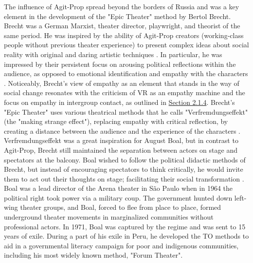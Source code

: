 \documentclass[dissertation,math,vertlayout,pdfa,colorlinks,nologo]{aaltoseries}
\begin{document}
The influence of Agit-Prop spread beyond the borders of Russia and was a key element in the development of the "Epic Theater" method by Bertol Brecht. Brecht was a German Marxist, theater director, playwright, and theorist of the same period. He was inspired by the ability of Agit-Prop creators (working-class people without previous theater experience) to present complex ideas about social reality with original and daring artistic techniques \cite{brechtBrechtTheatreTrans1964}. In particular, he was impressed by their persistent focus on arousing political reflections within the audience, as opposed to emotional identification and empathy with the characters \cite{brechtBrechtTheatreTrans1964,friedmanPerformanceActivismPrecursors2021}. Noticeably, Brecht's view of empathy as an element that stands in the way of social change resonates with the criticism of VR as an empathy machine and the focus on empathy in intergroup contact, as outlined in \hyperref[sec:vr_empathy]{Section 2.1.4}. Brecht's "Epic Theater" uses various theatrical methods that he calls "Verfremdungseffekt" (the "making strange effect"), replacing empathy with critical reflection, by creating a distance between the audience and the experience of the characters \cite{brechtBrechtTheatreTrans1964}. Verfremdungseffekt was a great inspiration for August Boal, but in contrast to Agit-Prop, Brecht still maintained the separation between actors on stage and spectators at the balcony. Boal wished to follow the political didactic methods of Brecht, but instead of encouraging spectators to think critically, he would invite them to act out their thoughts on stage; facilitating their social transformation \cite{boalTheatreOppressed2008}. Boal was a lead director of the Arena theater in São Paulo when in 1964 the political right took power via a military coup. The government hunted down left-wing theater groups, and Boal, forced to flee from place to place, formed underground theater movements in marginalized communities without professional actors. In 1971, Boal was captured by the regime and was sent to 15 years of exile. During a part of his exile in Peru, he developed the TO methods to aid in a governmental literacy campaign for poor and indigenous communities, including his most widely known method, "Forum Theater".
\end{document}
